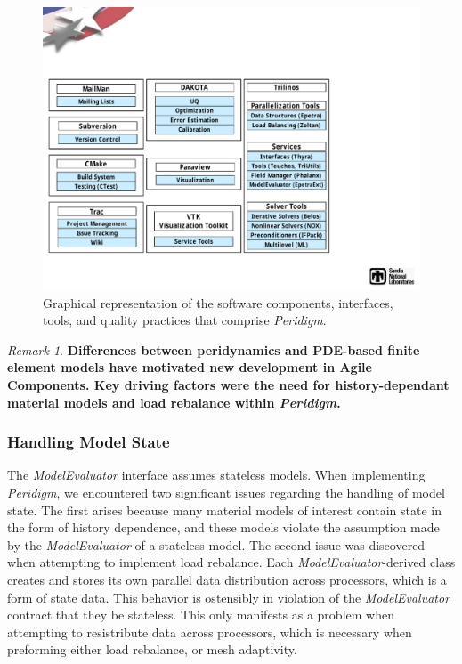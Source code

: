 \documentclass[10pt]{article}
\theoremstyle{plain}
\theoremstyle{definition}
\theoremstyle{remark}
\newtheorem{rem}{Remark}[section]
\numberwithin{equation}{section}
\begin{document}
\begin{figure}[h!]
\begin{center}
	\includegraphics[width=\linewidth]{PeridigmComponents}
 \end{center}
 \caption{Graphical representation of the software components, interfaces, tools, and quality practices that comprise \emph{Peridigm}.}
\label{fig:PeridigmComponents}
\end{figure}

\begin{rem}
\textbf{Differences between peridynamics and PDE-based finite element models have motivated new development in Agile Components. Key driving factors were the need for history-dependant material models and load rebalance within \emph{Peridigm}.}
\end{rem}

\subsubsection{Handling Model State}

The \emph{ModelEvaluator} interface assumes stateless models. When implementing \emph{Peridigm}, we encountered two significant issues regarding the handling of model state. The first arises because many material models of interest contain state in the form of history dependence, and these models violate the assumption made by the \emph{ModelEvaluator} of a stateless model. The second issue was discovered when attempting to implement load rebalance. Each \emph{ModelEvaluator}-derived class creates and stores its own parallel data distribution across processors, which is a form of state data. This behavior is ostensibly in violation of the \emph{ModelEvaluator} contract that they be stateless. This only manifests as a problem when attempting to resistribute data across processors, which is necessary when preforming either load rebalance, or mesh adaptivity. 
\end{document}
